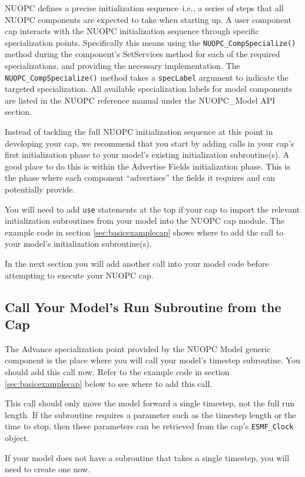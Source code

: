NUOPC defines a precise initialization sequence--i.e., a series of
steps that all NUOPC components are expected to take when starting
up.  A user component cap interacts with the NUOPC initialization
sequence through specific specialization points. Specifically this means
using the {\tt NUOPC\_CompSpecialize()} method during the component's
SetServices method for each of the required specializations, and providing the
necessary implementation. The {\tt NUOPC\_CompSpecialize()} method takes a
{\tt specLabel} argument to indicate the targeted specialization. All available
specialization labels for model components are listed in the NUOPC
reference manual under the NUOPC\_Model API section.

Instead of tackling the full NUOPC initialization sequence at this point in
developing your cap, we recommend that you start by adding calls in your cap's
first initialization phase to your model's existing initialization subroutine(s).
A good place to do this is within the Advertise Fields initialization phase.
This is the phase where each component ``advertises'' the fields it
requires and can potentially provide.  

You will need to add {\tt use} statements at the top if your cap to import the relevant
initialization subroutines from your model into the NUOPC cap module.
The example code in section \ref{sec:basicexamplecap} shows where to add the 
call to your model's initialization subroutine(s).

In the next section you will add another call into your model code
before attempting to execute your NUOPC cap.


\subsection{Call Your Model's Run Subroutine from the Cap}
\label{sec:callrunfromcap}
The Advance specialization point provided by the NUOPC Model
generic component is the place where you will call your
model's timestep subroutine.  You should add this call now. 
Refer to the example code in section \ref{sec:basicexamplecap} 
below to see where to add this call.

This call should only move the model forward a single timestep,
not the full run length.  If the subroutine requires a parameter 
such as the timestep length or the time to stop, then these 
parameters can be retrieved from the cap's {\tt ESMF\_Clock} object.

If your model does not have a subroutine that takes a single timestep,
you will need to create one now.


